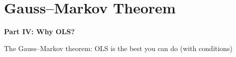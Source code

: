 \documentclass[aspectratio=169]{beamer}
\begin{document}
\section{Gauss--Markov Theorem}

\begin{frame}
\begin{center}
  \vspace{1.5cm}
  {\Huge\bfseries\textcolor{popblue}{Part IV: Why OLS?}}

  \vspace{0.8cm}
  {\large The Gauss--Markov theorem: OLS is the best you can do (with conditions)}
\end{center}
\end{frame}
\end{document}
